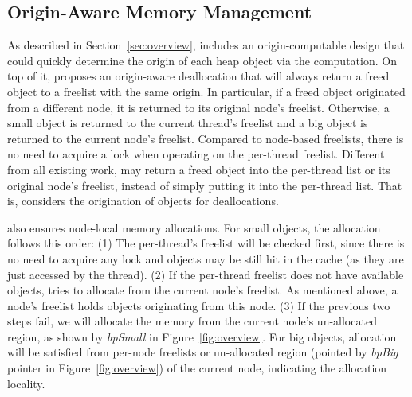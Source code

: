 \subsection{Origin-Aware Memory Management} 
\label{sec:origin}


As described in Section~\ref{sec:overview}, \NM{} includes an origin-computable design that could quickly determine the origin of each heap object via the computation. 
On top of it, \NM{} proposes an origin-aware deallocation that will always return a freed object to a freelist with the same origin. In particular, if a freed object originated from a different node, it is returned to its original node's  freelist. Otherwise, a small object is returned to the current thread's freelist and a big object is returned to the current node's freelist. Compared to node-based freelists, there is no need to acquire a lock when operating on the per-thread freelist. Different from all existing work, \NM{} may return a freed object into the per-thread list or its original node's freelist, instead of simply putting it into the per-thread list. That is, \NM{} considers the origination of objects for deallocations. 

\NM{} also ensures node-local memory allocations. For small objects, the allocation follows this order: (1) The per-thread's freelist will be checked first, since there is no need to acquire any lock and objects may be still hit in the cache (as they are just accessed by the thread). (2) If the per-thread freelist does not have available objects, \NM{} tries to allocate from the current node's freelist. As mentioned above, a node's freelist holds objects originating from this node. (3) If the previous two steps fail,  we will allocate the memory from the current node's un-allocated region, as shown by \textit{bpSmall} in Figure~\ref{fig:overview}. 
For big objects, allocation will be satisfied from per-node freelists or un-allocated region (pointed by \textit{bpBig} pointer in Figure~\ref{fig:overview}) of the current node, indicating the allocation locality. 
